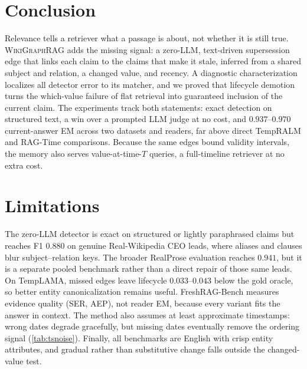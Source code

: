 \documentclass[letterpaper]{article}
\theoremstyle{plain}
\newcommand{\ours}{\textsc{WikiGraphRAG}}
\begin{document}
\section{Conclusion}
\label{sec:conclusion}
Relevance tells a retriever what a passage is about, not whether it is still true. \ours{} adds the missing signal: a zero-LLM, text-driven supersession edge that links each claim to the claims that make it stale, inferred from a shared subject and relation, a changed value, and recency. A diagnostic characterization localizes all detector error to its matcher, and we proved that lifecycle demotion turns the which-value failure of flat retrieval into guaranteed inclusion of the current claim. The experiments track both statements: exact detection on structured text, a win over a prompted LLM judge at no cost, and $0.937$--$0.970$ current-answer EM across two datasets and readers, far above direct TempRALM and RAG-Time comparisons. Because the same edges bound validity intervals, the memory also serves value-at-time-$T$ queries, a full-timeline retriever at no extra cost.

\section*{Limitations}
The zero-LLM detector is exact on structured or lightly paraphrased claims but reaches F1 $0.880$ on genuine Real-Wikipedia CEO leads, where aliases and clauses blur subject--relation keys. The broader RealProse evaluation reaches $0.941$, but it is a separate pooled benchmark rather than a direct repair of those same leads. On TempLAMA, missed edges leave lifecycle $0.033$--$0.043$ below the gold oracle, so better entity canonicalization remains useful. FreshRAG-Bench measures evidence quality (SER, AEP), not reader EM, because every variant fits the answer in context. The method also assumes at least approximate timestamps: wrong dates degrade gracefully, but missing dates eventually remove the ordering signal (\cref{tab:tsnoise}). Finally, all benchmarks are English with crisp entity attributes, and gradual rather than substitutive change falls outside the changed-value test.

\end{document}
